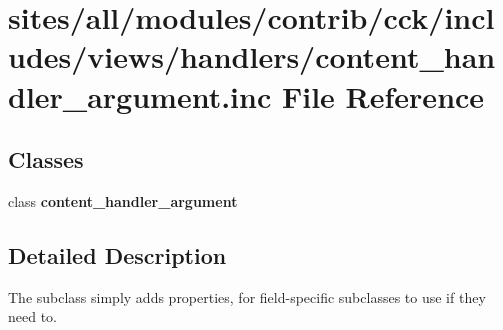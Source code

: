 \hypertarget{content__handler__argument_8inc}{
\section{sites/all/modules/contrib/cck/includes/views/handlers/content\_\-handler\_\-argument.inc File Reference}
\label{content__handler__argument_8inc}
}
\subsection*{Classes}
\begin{CompactItemize}
\item 
class \textbf{content\_\-handler\_\-argument}
\end{CompactItemize}


\subsection{Detailed Description}
The subclass simply adds properties, for field-specific subclasses to use if they need to. 